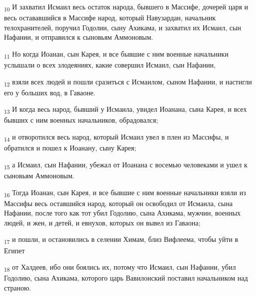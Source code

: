 \begin{tcolorbox}
\textsubscript{10} И захватил Исмаил весь остаток народа, бывшего в Массифе, дочерей царя и весь остававшийся в Массифе народ, который Навузардан, начальник телохранителей, поручил Годолии, сыну Ахикама, и захватил их Исмаил, сын Нафании, и отправился к сыновьям Аммоновым.
\end{tcolorbox}
\begin{tcolorbox}
\textsubscript{11} Но когда Иоанан, сын Карея, и все бывшие с ним военные начальники услышали о всех злодеяниях, какие совершил Исмаил, сын Нафании,
\end{tcolorbox}
\begin{tcolorbox}
\textsubscript{12} взяли всех людей и пошли сразиться с Исмаилом, сыном Нафании, и настигли его у больших вод, в Гаваоне.
\end{tcolorbox}
\begin{tcolorbox}
\textsubscript{13} И когда весь народ, бывший у Исмаила, увидел Иоанана, сына Карея, и всех бывших с ним военных начальников, обрадовался;
\end{tcolorbox}
\begin{tcolorbox}
\textsubscript{14} и отворотился весь народ, который Исмаил увел в плен из Массифы, и обратился и пошел к Иоанану, сыну Карея;
\end{tcolorbox}
\begin{tcolorbox}
\textsubscript{15} а Исмаил, сын Нафании, убежал от Иоанана с восемью человеками и ушел к сыновьям Аммоновым.
\end{tcolorbox}
\begin{tcolorbox}
\textsubscript{16} Тогда Иоанан, сын Карея, и все бывшие с ним военные начальники взяли из Массифы весь оставшийся народ, который он освободил от Исмаила, сына Нафании, после того как тот убил Годолию, сына Ахикама, мужчин, военных людей, и жен, и детей, и евнухов, которых он вывел из Гаваона;
\end{tcolorbox}
\begin{tcolorbox}
\textsubscript{17} и пошли, и остановились в селении Химам, близ Вифлеема, чтобы уйти в Египет
\end{tcolorbox}
\begin{tcolorbox}
\textsubscript{18} от Халдеев, ибо они боялись их, потому что Исмаил, сын Нафании, убил Годолию, сына Ахикама, которого царь Вавилонский поставил начальником над страною.
\end{tcolorbox}
